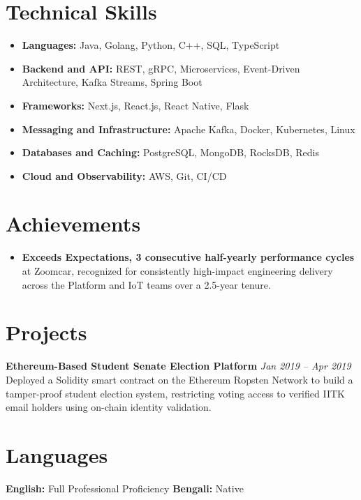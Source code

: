 \documentclass[11pt,a4paper]{article}
\begin{document}
\vspace{4pt}

\section{Technical Skills}
\begin{itemize}[leftmargin=*, noitemsep, parsep=2pt, itemsep=2pt]
    \item \textbf{Languages:} Java, Golang, Python, C++, SQL, TypeScript
    \item \textbf{Backend and API:} REST, gRPC, Microservices, Event-Driven Architecture, Kafka Streams, Spring Boot
    \item \textbf{Frameworks:} Next.js, React.js, React Native, Flask
    \item \textbf{Messaging and Infrastructure:} Apache Kafka, Docker, Kubernetes, Linux
    \item \textbf{Databases and Caching:} PostgreSQL, MongoDB, RocksDB, Redis
    \item \textbf{Cloud and Observability:} AWS, Git, CI/CD
\end{itemize}

\section{Achievements}
\begin{itemize}[leftmargin=*, noitemsep, topsep=1pt, label={\small\textbullet}, itemsep=0pt]
    \item \textbf{Exceeds Expectations, 3 consecutive half-yearly performance cycles} at Zoomcar, recognized for consistently high-impact engineering delivery across the Platform and IoT teams over a 2.5-year tenure.
\end{itemize}

\section{Projects}
\noindent\textbf{Ethereum-Based Student Senate Election Platform} \hfill \textit{Jan 2019 -- Apr 2019} \\
Deployed a Solidity smart contract on the Ethereum Ropsten Network to build a tamper-proof student election system, restricting voting access to verified IITK email holders using on-chain identity validation.

\vspace{4pt}

\section{Languages}
\textbf{English:} Full Professional Proficiency \quad \textbf{Bengali:} Native

\vfill
\end{document}
